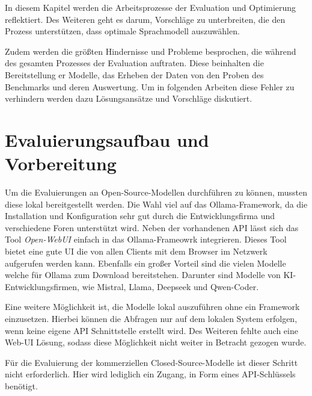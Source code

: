 In diesem Kapitel werden die Arbeitsprozesse der Evaluation und Optimierung reflektiert. Des Weiteren geht es darum, Vorschläge zu unterbreiten, die den Prozess unterstützen, dass optimale Sprachmodell auszuwählen.\vspace{0.2cm}

Zudem werden die größten Hindernisse und Probleme besprochen, die während des gesamten Prozesses der Evaluation auftraten. Diese beinhalten die Bereitstellung er Modelle, das Erheben der Daten von den Proben des Benchmarks und deren Auswertung. Um in folgenden Arbeiten diese Fehler zu verhindern werden dazu Lösungsansätze und Vorschläge diskutiert.



\section{Evaluierungsaufbau und Vorbereitung}
Um die Evaluierungen an Open-Source-Modellen durchführen zu können, mussten diese lokal bereitgestellt werden. Die Wahl viel auf das Ollama-Framework, da die Installation und Konfiguration sehr gut durch die Entwicklungsfirma und verschiedene Foren unterstützt wird. Neben der vorhandenen API lässt sich das Tool \textit{Open-WebUI} einfach in das Ollama-Frameowrk integrieren. Dieses Tool bietet eine gute UI die von allen Clients mit dem Browser im Netzwerk aufgerufen werden kann. Ebenfalls ein großer Vorteil sind die vielen Modelle welche für Ollama zum Download bereitstehen. Darunter sind Modelle von KI-Entwicklungsfirmen, wie Mistral, Llama, Deepseek und Qwen-Coder.\vspace{0.2cm}

Eine weitere Möglichkeit ist, die Modelle lokal auszuführen ohne ein Framework einzusetzen. Hierbei können die Abfragen nur auf dem lokalen System erfolgen, wenn keine eigene API Schnittstelle erstellt wird. Des Weiteren fehlte auch eine Web-UI Lösung, sodass diese Möglichkeit nicht weiter in Betracht gezogen wurde.\vspace{0.2cm}

Für die Evaluierung der kommerziellen Closed-Source-Modelle ist dieser Schritt nicht erforderlich. Hier wird lediglich ein Zugang, in Form eines API-Schlüssels benötigt.\vspace{0.2cm}



